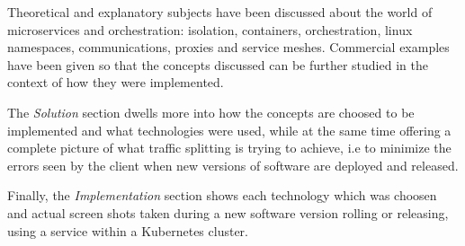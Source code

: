 \documentclass[conference]{IEEEtran}
\begin{document}
    Theoretical and explanatory subjects have been discussed about the world of microservices and orchestration: isolation, containers, orchestration, linux namespaces, communications, proxies and service meshes. Commercial examples have been given so that the concepts discussed can be further studied in the context of how they were implemented.

    The \textit{Solution} section dwells more into how the concepts are choosed to be implemented and what technologies were used, while at the same time offering a complete picture of what traffic splitting is trying to achieve, i.e to minimize the errors seen by the client when new versions of software are deployed and released.

    Finally, the \textit{Implementation} section shows each technology which was choosen and actual screen shots taken during a new software version rolling or releasing, using a service within a Kubernetes cluster.
\end{document}
